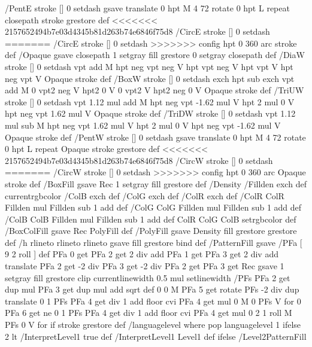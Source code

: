 {{{/PentE {stroke [] 0 setdash gsave
  translate 0 hpt M 4 {72 rotate 0 hpt L} repeat
  closepath stroke grestore} def
<<<<<<< 2157652494b7e03d4345b81d263b74e6846f75d8
/CircE {stroke [] 0 setdash 
=======
/CircE {stroke [] 0 setdash
>>>>>>> config
  hpt 0 360 arc stroke} def
/Opaque {gsave closepath 1 setgray fill grestore 0 setgray closepath} def
/DiaW {stroke [] 0 setdash vpt add M
  hpt neg vpt neg V hpt vpt neg V
  hpt vpt V hpt neg vpt V Opaque stroke} def
/BoxW {stroke [] 0 setdash exch hpt sub exch vpt add M
  0 vpt2 neg V hpt2 0 V 0 vpt2 V
  hpt2 neg 0 V Opaque stroke} def
/TriUW {stroke [] 0 setdash vpt 1.12 mul add M
  hpt neg vpt -1.62 mul V
  hpt 2 mul 0 V
  hpt neg vpt 1.62 mul V Opaque stroke} def
/TriDW {stroke [] 0 setdash vpt 1.12 mul sub M
  hpt neg vpt 1.62 mul V
  hpt 2 mul 0 V
  hpt neg vpt -1.62 mul V Opaque stroke} def
/PentW {stroke [] 0 setdash gsave
  translate 0 hpt M 4 {72 rotate 0 hpt L} repeat
  Opaque stroke grestore} def
<<<<<<< 2157652494b7e03d4345b81d263b74e6846f75d8
/CircW {stroke [] 0 setdash 
=======
/CircW {stroke [] 0 setdash
>>>>>>> config
  hpt 0 360 arc Opaque stroke} def
/BoxFill {gsave Rec 1 setgray fill grestore} def
/Density {
  /Fillden exch def
  currentrgbcolor
  /ColB exch def /ColG exch def /ColR exch def
  /ColR ColR Fillden mul Fillden sub 1 add def
  /ColG ColG Fillden mul Fillden sub 1 add def
  /ColB ColB Fillden mul Fillden sub 1 add def
  ColR ColG ColB setrgbcolor} def
/BoxColFill {gsave Rec PolyFill} def
/PolyFill {gsave Density fill grestore grestore} def
/h {rlineto rlineto rlineto gsave fill grestore} bind def
%
%
/PatternFill {gsave /PFa [ 9 2 roll ] def
  PFa 0 get PFa 2 get 2 div add PFa 1 get PFa 3 get 2 div add translate
  PFa 2 get -2 div PFa 3 get -2 div PFa 2 get PFa 3 get Rec
  gsave 1 setgray fill grestore clip
  currentlinewidth 0.5 mul setlinewidth
  /PFs PFa 2 get dup mul PFa 3 get dup mul add sqrt def
  0 0 M PFa 5 get rotate PFs -2 div dup translate
  0 1 PFs PFa 4 get div 1 add floor cvi
	{PFa 4 get mul 0 M 0 PFs V} for
  0 PFa 6 get ne {
	0 1 PFs PFa 4 get div 1 add floor cvi
	{PFa 4 get mul 0 2 1 roll M PFs 0 V} for
 } if
  stroke grestore} def
%
/languagelevel where
 {pop languagelevel} {1} ifelse
 2 lt
	{/InterpretLevel1 true def}
	{/InterpretLevel1 Level1 def}
 ifelse
%
%
/Level2PatternFill {
}}}}}}

